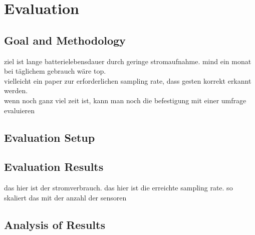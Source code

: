 \chapter{Evaluation}
\label{ch:evaluation}

\section{Goal and Methodology}
ziel ist lange batterielebensdauer durch geringe stromaufnahme. mind ein monat bei täglichem gebrauch wäre top.\\
vielleicht ein paper zur erforderlichen sampling rate, dass gesten korrekt erkannt werden.\\
wenn noch ganz viel zeit ist, kann man noch die befestigung mit einer umfrage evaluieren

\section{Evaluation Setup}

\section{Evaluation Results}
das hier ist der stromverbrauch. das hier ist die erreichte sampling rate. so skaliert das mit der anzahl der sensoren

\section{Analysis of Results}
